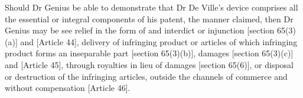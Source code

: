 \documentclass[11pt]{article}
\begin{document}
Should Dr Genius be able to demonstrate that Dr De Ville's device comprises all the essential or integral components of his patent, the manner claimed, then Dr Genius may be see relief in the form of and interdict or injunction [section 65(3)(a)]\cite{rsa78_patents_act} and [Article 44]\cite{wto17_trips}, delivery of infringing product or articles of which infringing product forms an inseparable part [section 65(3)(b)]\cite{rsa78_patents_act}, damages [section 65(3)(c)]\cite{rsa78_patents_act} and [Article 45]\cite{wto17_trips}, through royalties in lieu of damages [section 65(6)]\cite{rsa78_patents_act}, or disposal or destruction of the infringing articles, outside the channels of commerce and without compensation [Article 46]\cite{wto17_trips}.


\printbibliography
\end{document}
